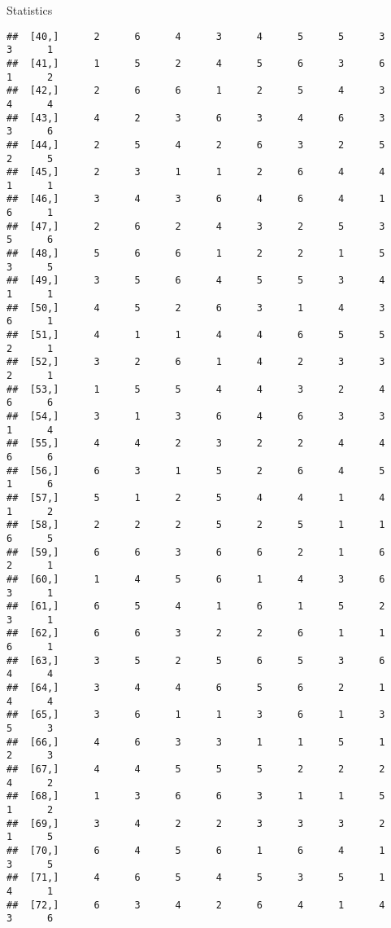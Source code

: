 \documentclass[
  ignorenonframetext,
]{beamer}
\begin{document}
\begin{frame}[fragile]{Statistics}
\begin{verbatim}
##  [40,]      2      6      4      3      4      5      5      3      3      1
##  [41,]      1      5      2      4      5      6      3      6      1      2
##  [42,]      2      6      6      1      2      5      4      3      4      4
##  [43,]      4      2      3      6      3      4      6      3      3      6
##  [44,]      2      5      4      2      6      3      2      5      2      5
##  [45,]      2      3      1      1      2      6      4      4      1      1
##  [46,]      3      4      3      6      4      6      4      1      6      1
##  [47,]      2      6      2      4      3      2      5      3      5      6
##  [48,]      5      6      6      1      2      2      1      5      3      5
##  [49,]      3      5      6      4      5      5      3      4      1      1
##  [50,]      4      5      2      6      3      1      4      3      6      1
##  [51,]      4      1      1      4      4      6      5      5      2      1
##  [52,]      3      2      6      1      4      2      3      3      2      1
##  [53,]      1      5      5      4      4      3      2      4      6      6
##  [54,]      3      1      3      6      4      6      3      3      1      4
##  [55,]      4      4      2      3      2      2      4      4      6      6
##  [56,]      6      3      1      5      2      6      4      5      1      6
##  [57,]      5      1      2      5      4      4      1      4      1      2
##  [58,]      2      2      2      5      2      5      1      1      6      5
##  [59,]      6      6      3      6      6      2      1      6      2      1
##  [60,]      1      4      5      6      1      4      3      6      3      1
##  [61,]      6      5      4      1      6      1      5      2      3      1
##  [62,]      6      6      3      2      2      6      1      1      6      1
##  [63,]      3      5      2      5      6      5      3      6      4      4
##  [64,]      3      4      4      6      5      6      2      1      4      4
##  [65,]      3      6      1      1      3      6      1      3      5      3
##  [66,]      4      6      3      3      1      1      5      1      2      3
##  [67,]      4      4      5      5      5      2      2      2      4      2
##  [68,]      1      3      6      6      3      1      1      5      1      2
##  [69,]      3      4      2      2      3      3      3      2      1      5
##  [70,]      6      4      5      6      1      6      4      1      3      5
##  [71,]      4      6      5      4      5      3      5      1      4      1
##  [72,]      6      3      4      2      6      4      1      4      3      6

\end{verbatim}
\end{frame}
\end{document}
